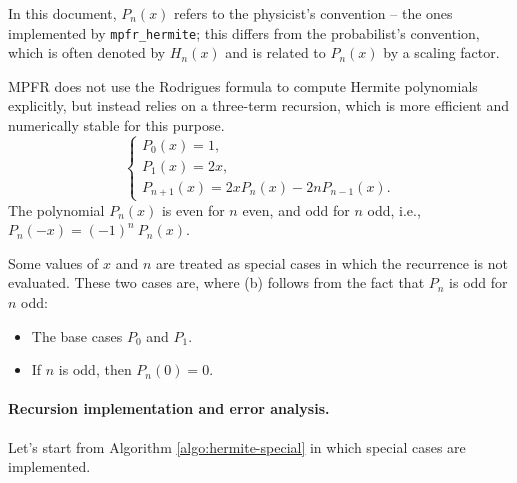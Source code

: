 \documentclass[12pt]{amsart}
\begin{document}
In this document, $P_n(x)$ refers to the physicist's convention -- the
ones implemented by \texttt{mpfr\_hermite}; this differs from the
probabilist's convention, which is often denoted by $H_n(x)$ and is
related to $P_n(x)$ by a scaling factor.

MPFR does not use the Rodrigues formula to compute Hermite polynomials
explicitly, but instead relies on a three-term recursion, which is more
efficient and numerically stable for this purpose.
\begin{equation} \label{eq:hermite-recursion}
  \begin{cases}
      P_0(x) = 1,  \\
      P_1(x) = 2x, \\
      P_{n+1}(x) = 2xP_{n}(x) - 2nP_{n-1}(x).
  \end{cases}
\end{equation}
The polynomial $P_n(x)$ is even for $n$ even, and odd for $n$ odd,
i.e., $P_n(-x) = (-1)^n~P_n(x)$.

Some values of $x$ and $n$ are treated as special cases in which the
recurrence is not evaluated. These two cases are, where (b) follows
from the fact that $P_n$ is odd for $n$ odd:
\begin{itemize}
\item[(a)] The base cases $P_0$ and $P_1$.
\item[(b)] If $n$ is odd, then $P_n(0) = 0$.
\end{itemize}

\paragraph{\textbf{Recursion implementation and error analysis.}}

Let's start from Algorithm \ref{algo:hermite-special} in which special cases
are implemented.
\vspace{.3cm}

\begin{algorithm}[H]
  \caption{\texttt{mpfr\_hermite} special cases}
  \label{algo:hermite-special}
  \BlankLine
  \BlankLine
\end{algorithm}
\vspace{.3cm}
\end{document}
